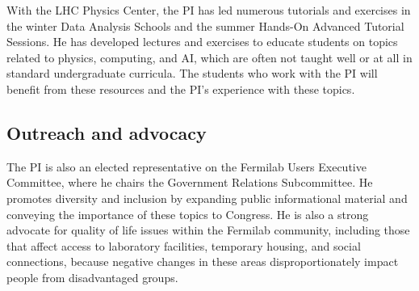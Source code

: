 With the LHC Physics Center, the PI has led numerous tutorials and exercises in the winter Data Analysis Schools
and the summer Hands-On Advanced Tutorial Sessions.
He has developed lectures and exercises to educate students on topics related to physics, computing, and AI,
which are often not taught well or at all in standard undergraduate curricula.
The students who work with the PI will benefit from these resources
and the PI's experience with these topics.

\subsection{Outreach and advocacy}

The PI is also an elected representative on the Fermilab Users Executive Committee,
where he chairs the Government Relations Subcommittee.
He promotes diversity and inclusion by expanding public informational material
and conveying the importance of these topics to Congress.
He is also a strong advocate for quality of life issues within the Fermilab community,
including those that affect access to laboratory facilities, temporary housing, and social connections,
because negative changes in these areas disproportionately impact people from disadvantaged groups.
